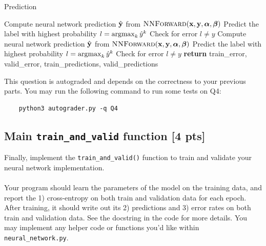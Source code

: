 \begin{algorithm}[H]
  \caption{Prediction}
  \label{alg:predict}
  \begin{algorithmic}[1] %
    \For{$(\xv,\yv) \in \Dc$}
      \State Compute neural network prediction $\hat{\mathbf{y}}$ from $\textproc{NNForward}(\xv, \yv, \alphav, \betav)$
      \State Predict the label with highest probability $l = \mathop{\mathrm{argmax}}_k \hat{y}^k$
      \State Check for error $l \neq y$
    \EndFor
      \State Compute neural network prediction $\hat{\mathbf{y}}$ from $\textproc{NNForward}(\xv, \yv, \alphav, \betav)$
      \State Predict the label with highest probability $l = \mathop{\mathrm{argmax}}_k \hat{y}^k$
      \State Check for error $l \neq y$
    \EndFor
    \State \textbf{return} train\_error, valid\_error, train\_predictions, valid\_predictions
    \EndProcedure
  \end{algorithmic}
\end{algorithm}
This question is autograded and depends on the correctness to your previous parts. You may run the following command to run some tests on Q4:
\begin{verbatim}
    python3 autograder.py -q Q4
\end{verbatim}
\vspace{0.3in}
\subsection{Main \texttt{train\_and\_valid} function [4 pts]}
Finally, implement the \texttt{train\_and\_valid()} function to train and validate your neural network implementation. 
\\\\ Your program should learn the parameters of the model on the training data, and report the 1) cross-entropy on both train and validation data for each epoch. After training, it should write out its 2) predictions and 3) error rates on both train and validation data. See the docstring in the code for more details. You may implement any helper code or functions you'd like within \texttt{neural\_network.py}.
%

